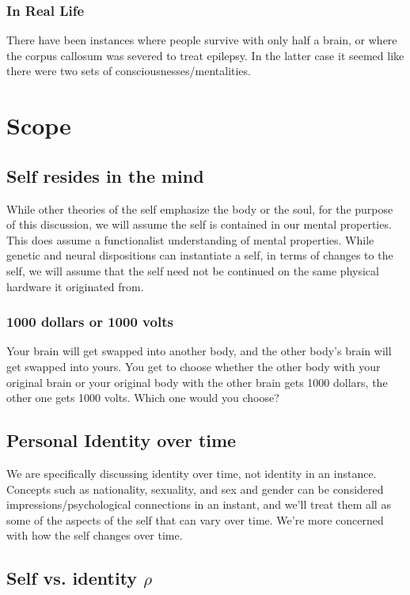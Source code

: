 \documentclass[11pt]{article}
\begin{document}
\subsubsection*{In Real Life}
\label{sec:orga8d9bd6}
There have been instances where people survive with only half a brain, or where the corpus callosum was severed to treat epilepsy.
In the latter case it seemed like there were two sets of consciousnesses/mentalities.

\section{Scope}
\label{sec:org5dcd830}
\subsection{Self resides in the mind}
\label{sec:org568a6d0}
While other theories of the self emphasize the body or the soul,
for the purpose of this discussion,
we will assume the self is contained in our mental properties.
This does assume a functionalist understanding of mental properties.
While genetic and neural dispositions can instantiate a self, in terms of changes to the self, we will assume that the self need not be continued on the same physical hardware it originated from.

\subsubsection*{1000 dollars or 1000 volts}
\label{sec:org73dcd44}
Your brain will get swapped into another body, and the other body's brain will get swapped into yours.
You get to choose whether the other body with your original brain or your original body with the other brain gets 1000 dollars, the other one gets 1000 volts.
Which one would you choose?

\subsection{Personal Identity over time}
\label{sec:org2c6b9f6}
We are specifically discussing identity over time, not identity in an instance.
Concepts such as nationality, sexuality, and sex and gender can be considered impressions/psychological connections in an instant, and we'll treat them all as some of the aspects of the self that can vary over time.
We're more concerned with how the self changes over time.

\subsection{Self vs. identity \(\rho\)}
\label{sec:org21789f6}
\end{document}

